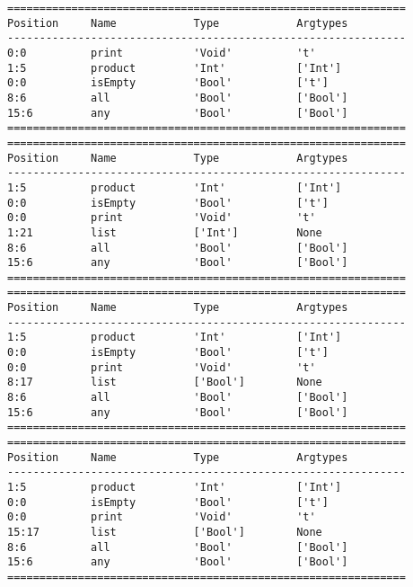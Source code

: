 \documentclass[a4paper]{article}
\begin{document}
\begin{verbatim}
==============================================================
Position     Name            Type            Argtypes            
--------------------------------------------------------------
0:0          print           'Void'          't'                 
1:5          product         'Int'           ['Int']             
0:0          isEmpty         'Bool'          ['t']               
8:6          all             'Bool'          ['Bool']            
15:6         any             'Bool'          ['Bool']            
==============================================================
==============================================================
Position     Name            Type            Argtypes            
--------------------------------------------------------------
1:5          product         'Int'           ['Int']             
0:0          isEmpty         'Bool'          ['t']               
0:0          print           'Void'          't'                 
1:21         list            ['Int']         None                
8:6          all             'Bool'          ['Bool']            
15:6         any             'Bool'          ['Bool']            
==============================================================
==============================================================
Position     Name            Type            Argtypes            
--------------------------------------------------------------
1:5          product         'Int'           ['Int']             
0:0          isEmpty         'Bool'          ['t']               
0:0          print           'Void'          't'                 
8:17         list            ['Bool']        None                
8:6          all             'Bool'          ['Bool']            
15:6         any             'Bool'          ['Bool']            
==============================================================
==============================================================
Position     Name            Type            Argtypes            
--------------------------------------------------------------
1:5          product         'Int'           ['Int']             
0:0          isEmpty         'Bool'          ['t']               
0:0          print           'Void'          't'                 
15:17        list            ['Bool']        None                
8:6          all             'Bool'          ['Bool']            
15:6         any             'Bool'          ['Bool']            
==============================================================
\end{verbatim}
\end{document}
